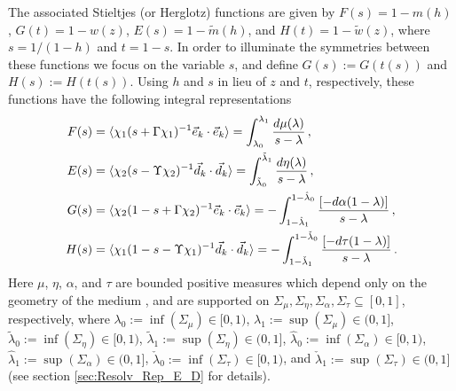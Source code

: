 \documentclass[english,12pt]{ttuthes}
\begin{document}
The associated Stieltjes (or Herglotz) functions are given by $F(s)=1-m(h)$,
$G(t)=1-w(z)$, $E(s)=1-\tilde{m}(h)$, and $H(t)=1-\tilde{w}(z)$, where
$s=1/(1-h)$ and $t=1-s$. In order to illuminate the symmetries between
these functions we focus on the variable $s$, and define
$G(s):=G(t(s))$ and $H(s):=H(t(s))$. Using $h$ and $s$ in lieu of $z$
and $t$, respectively, these functions have the following integral
representations 
% 
\begin{align}\label{eq:Herglotz_Funs_sed_LYRB}
  F(s)&=\langle\chi_1(s+\Gamma\chi_1)^{-1}\vec{e}_k\cdot\vec{e}_k\rangle=\int_{\lambda_0}^{\lambda_1}\frac{d\mu(\lambda)}{s-\lambda}\,,\\
  E(s)&=\langle\chi_2(s-\Upsilon\chi_2)^{-1}\vec{d}_k\cdot\vec{d}_k\rangle=\int_{\tilde{\lambda}_0}^{\tilde{\lambda}_1}\frac{d\eta(\lambda)}{s-\lambda}\,,
   \notag \\
  G(s)&=\langle\chi_2(1-s+\Gamma\chi_2)^{-1}\vec{e}_k\cdot\vec{e}_k\rangle=-\int_{1-\hat{\lambda}_1}^{1-\hat{\lambda}_0}\frac{[-d\alpha(1-\lambda)]}{s-\lambda}\,,
   \notag \\
  H(s)&=\langle\chi_1(1-s-\Upsilon\chi_1)^{-1}\vec{d}_k\cdot\vec{d}_k\rangle=-\int_{1-\check{\lambda}_1}^{1-\check{\lambda}_0}\frac{[-d\tau(1-\lambda)]}{s-\lambda}\,.
  \notag
\end{align}
%
Here $\mu$, $\eta$, $\alpha$, and $\tau$ are bounded positive measures which
depend only on the geometry of the medium
\cite{Golden:CMP-473,Bergman:AP-78}, and are supported on
$\Sigma_\mu,\Sigma_\eta,\Sigma_\alpha,\Sigma_\tau\subseteq[0,1]$, respectively, where $\lambda_0:=\inf(\Sigma_\mu)\in[0,1)$, 
$\lambda_1:=\sup(\Sigma_\mu)\in(0,1]$, $\tilde{\lambda}_0:=\inf(\Sigma_\eta)\in[0,1)$, $\tilde{\lambda}_1:=\sup(\Sigma_\eta)\in(0,1]$,
$\hat{\lambda}_0:=\inf(\Sigma_\alpha)\in[0,1)$, $\hat{\lambda}_1:=\sup(\Sigma_\alpha)\in(0,1]$,
$\check{\lambda}_0:=\inf(\Sigma_\tau)\in[0,1)$, and  $\check{\lambda}_1:=\sup(\Sigma_\tau)\in(0,1]$ (see section
\ref{sec:Resolv_Rep_E_D} for details).
\end{document}
